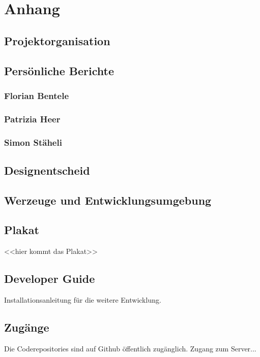 \chapter{Anhang}



\section{Projektorganisation}



\section{Persönliche Berichte}

\subsection{Florian Bentele}


\subsection{Patrizia Heer}

\subsection{Simon Stäheli}


\section{Designentscheid}


\section{Werzeuge und Entwicklungsumgebung}


\section{Plakat}
<<hier kommt das Plakat>>

\section{Developer Guide}
Installationsanleitung für die weitere Entwicklung.


\section{Zugänge}
Die Coderepositories sind auf Github öffentlich zugänglich. Zugang zum Server... 

